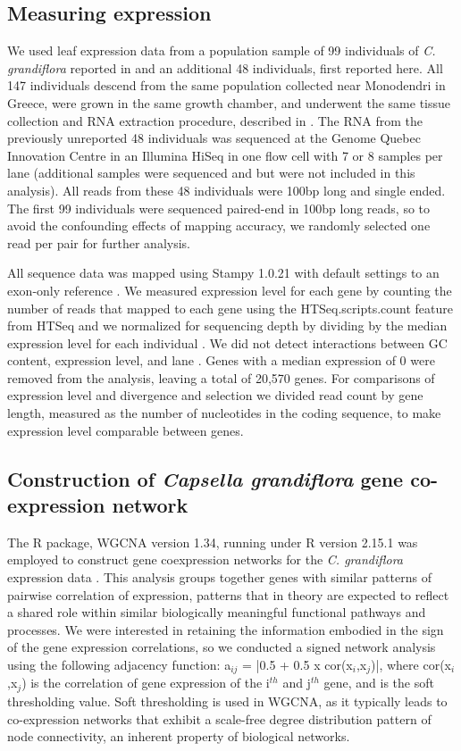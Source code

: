 \subsection{Measuring expression}
We used leaf expression data from a population sample of 99 individuals of \textit{C. grandiflora} reported in \citet{Josephs2015-nx} and an additional 48 individuals, first reported here. All 147 individuals descend from the same population collected near Monodendri in Greece, were grown in the same growth chamber, and underwent the same tissue collection and RNA extraction procedure, described in \citet{Josephs2015-nx}. The RNA from the previously unreported 48 individuals was sequenced at the Genome Quebec Innovation Centre in an Illumina HiSeq in one flow cell with 7 or 8 samples per lane (additional samples were sequenced and but were not included in this analysis). All reads from these 48 individuals were 100bp long and single ended. The first 99 individuals were sequenced paired-end in 100bp long reads, so to avoid the confounding effects of mapping accuracy, we randomly selected one read per pair for further analysis.

All sequence data was mapped using Stampy 1.0.21 \citep{Lunter2011-uc} with default settings to an exon-only reference \citep{Josephs2015-nx}. We measured expression level for each gene by counting the number of reads that mapped to each gene using the HTSeq.scripts.count feature from HTSeq and we normalized for sequencing depth by dividing by the median expression level for each individual \citep{Anders2015-qa}. We did not detect interactions between GC content, expression level, and lane \citep{Josephs2015-nx}. Genes with a median expression of 0 were removed from the analysis, leaving a total of 20,570 genes. For comparisons of expression level and divergence and selection we divided read count by gene length, measured as the number of nucleotides in the coding sequence, to make expression level comparable between genes.

\subsection{Construction of \textit{Capsella grandiflora} gene co-expression network}
The R package, WGCNA version 1.34, running under R version 2.15.1 \citep{r} was employed to construct gene coexpression networks for the \textit{C. grandiflora} expression data \citep{langfelder2008}. This analysis groups together genes with similar patterns of pairwise correlation of expression, patterns that in theory are expected to reflect a shared role within similar biologically meaningful functional pathways and processes. We were interested in retaining the information embodied in the sign of the gene expression correlations, so we conducted a signed network analysis using the following adjacency function: a$_{ij}$ = |0.5 + 0.5 x cor(x$_{i}$,x$_{j}$)|, where cor(x$_{i}$,x$_{j}$) is the correlation of gene expression of the i$^{th}$ and j$^{th}$ gene, and is the soft thresholding value. Soft thresholding is used in WGCNA, as it typically leads to co-expression networks that exhibit a scale-free degree distribution pattern of node connectivity, an inherent property of biological networks. 

